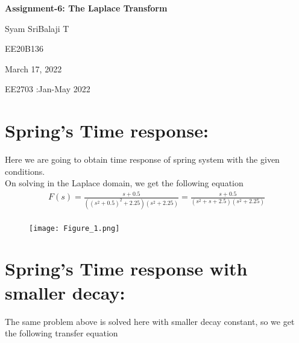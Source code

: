 \documentclass[12pt]{article}
\newcommand\titleofdoc{\textbf{Assignment-6: The Laplace Transform}}
\begin{document}
\begin{titlepage}
   \begin{center}
        \vspace*{4cm} %

        \Huge{\titleofdoc} 

        \vspace{3 cm}
        \Large{Syam SriBalaji T}
       
        \vspace{0.25cm}
        \large{EE20B136}
       
        \vspace{3 cm}
        \Large{March 17, 2022}
        
        \vspace{0.25 cm}
        \Large{EE2703 :Jan-May 2022}
       

       \vfill
    \end{center}
\end{titlepage}

\setcounter{page}{2}
\pagestyle{fancy}
\fancyhf{}
\rhead{\thepage}

\section*{Spring's Time response:}

Here we are going to obtain time response of spring system with the given conditions.\\
On solving in the Laplace domain, we get the following equation\\
\begin{multline}  
F(s)=\frac{s + 0.5}{((s^2 + 0.5)^2 + 2.25)(s^2 + 2.25)}=\frac{s + 0.5}{(s^2 + s + 2.5)(s^2 + 2.25)}\\
\end{multline} 

\begin{figure}[h!]
\centering
\texttt{[image: Figure\_1.png]}
\end{figure}

\newpage
\section*{Spring's Time response with smaller decay:}

The same problem above is solved here with smaller decay constant, so we get the following transfer equation\\
\end{document}
